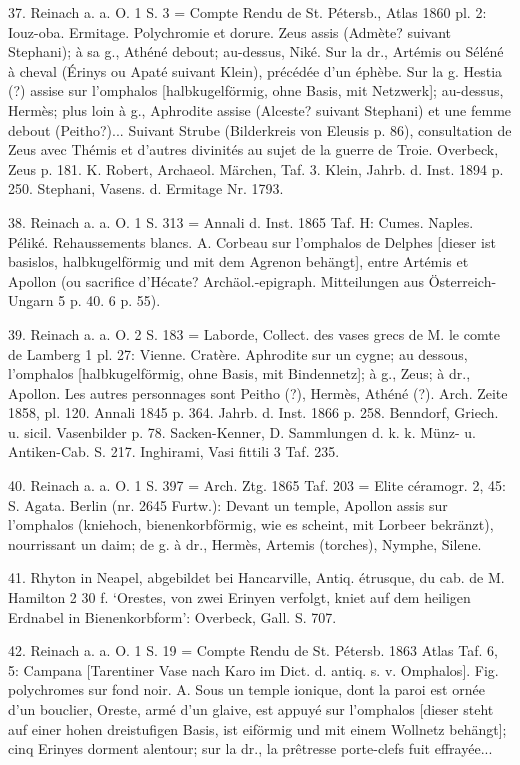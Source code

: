 \documentclass[a4paper, 11pt, oneside]{article}
\begin{document}
37. Reinach a. a. O. 1 S. 3 = Compte Rendu de St. Pétersb., Atlas 1860 pl. 2: Iouz-oba. Ermitage. Polychromie et dorure. Zeus assis (Admète? suivant Stephani); à sa g., Athéné debout; au-dessus, Niké. Sur la dr., Artémis ou Séléné à cheval (Érinys ou Apaté suivant Klein), précédée d'un éphèbe. Sur la g. Hestia (?) assise sur l'omphalos [halbkugelförmig, ohne Basis, mit Netzwerk]; au-dessus, Hermès; plus loin à g., Aphrodite assise (Alceste? suivant Stephani) et une femme debout (Peitho?)... Suivant Strube (Bilderkreis von Eleusis p. 86), consultation de Zeus avec Thémis et d'autres divinités au sujet de la guerre de Troie. Overbeck, Zeus p. 181. K. Robert, Archaeol. Märchen, Taf. 3. Klein, Jahrb. d. Inst. 1894 p. 250. Stephani, Vasens. d. Ermitage Nr. 1793.

38. Reinach a. a. O. 1 S. 313 = Annali d. Inst. 1865 Taf. H: Cumes. Naples. Péliké. Rehaussements blancs. A. Corbeau sur l'omphalos de Delphes [dieser ist basislos, halbkugelförmig und mit dem Agrenon behängt], entre Artémis et Apollon (ou sacrifice d'Hécate? Archäol.-epigraph. Mitteilungen aus Österreich-Ungarn 5 p. 40. 6 p. 55).

39. Reinach a. a. O. 2 S. 183 = Laborde, Collect. des vases grecs de M. le comte de Lamberg 1 pl. 27: Vienne. Cratère. Aphrodite sur un cygne; au dessous, l'omphalos [halbkugelförmig, ohne Basis, mit Bindennetz]; à g., Zeus; à dr., Apollon. Les autres personnages sont Peitho (?), Hermès, Athéné (?). Arch. Zeite 1858, pl. 120. Annali 1845 p. 364. Jahrb. d. Inst. 1866 p. 258. Benndorf, Griech. u. sicil. Vasenbilder p. 78. Sacken-Kenner, D. Sammlungen d. k. k. Münz- u. Antiken-Cab. S. 217. Inghirami, Vasi fittili 3 Taf. 235.

40. Reinach a. a. O. 1 S. 397 = Arch. Ztg. 1865 Taf. 203 = Elite céramogr. 2, 45: S. Agata. Berlin (nr. 2645 Furtw.): Devant un temple, Apollon assis sur l'omphalos (kniehoch, bienenkorbförmig, wie es scheint, mit Lorbeer bekränzt), nourrissant un daim; de g. à dr., Hermès, Artemis (torches), Nymphe, Silene.

41. Rhyton in Neapel, abgebildet bei Hancarville, Antiq. étrusque, du cab. de M. Hamilton 2 30 f. `Orestes, von zwei Erinyen verfolgt, kniet auf dem heiligen Erdnabel in Bienenkorbform': Overbeck, Gall. S. 707.

42. Reinach a. a. O. 1 S. 19 = Compte Rendu de St. Pétersb. 1863 Atlas Taf. 6, 5: Campana [Tarentiner Vase nach Karo im Dict. d. antiq. s. v. Omphalos]. Fig. polychromes sur fond noir. A. Sous un temple ionique, dont la paroi est ornée d'un bouclier, Oreste, armé d'un glaive, est appuyé sur l'omphalos [dieser steht auf einer hohen dreistufigen Basis, ist eiförmig und mit einem Wollnetz behängt]; cinq Erinyes dorment alentour; sur la dr., la prêtresse porte-clefs fuit effrayée...
\end{document}
